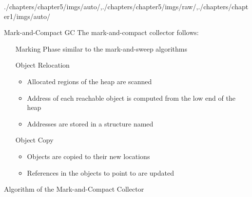 \begin{graphicspathcontext}{{./chapters/chapter5/imgs/auto/},{./chapters/chapter5/imgs/raw/},{./chapters/chapter1/imgs/auto/}}
\begin{bibunit}[apalike]
\begin{frame}[background=6]{Mark-and-Compact GC}
	The mark-and-compact collector follows:
	\vfill
	\begin{enumerate}
		\item[Marking Phase] similar to the mark-and-sweep algorithms
		\vspace{.5cm}
		\item[Object Relocation] \begin{itemize}
			\item Allocated regions of the heap are scanned
			\item Address of each reachable object is computed from the low end of the heap
			\item Addresses are stored in a structure named 
		\end{itemize}
		\vspace{.5cm}
		\item[Object Copy] \begin{itemize}
			\item Objects are copied to their new locations
			\item References in the objects to point to are updated
		\end{itemize}
	\end{enumerate}
\end{frame}

\begin{frame}[t]{Algorithm of the Mark-and-Compact Collector }
	\begin{footnotesize}
		\begin{myalgorithm}
			\BlankLine
		\end{myalgorithm}
	\end{footnotesize}
\end{frame}


\end{bibunit}
\end{graphicspathcontext}
